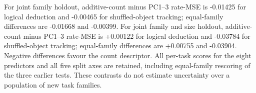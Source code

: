 For joint family holdout, additive-count minus PC1--3 rate-MSE is -0.01425 for logical deduction and -0.00465 for shuffled-object tracking; equal-family differences are -0.01668 and -0.00399. For joint family and size holdout, additive-count minus PC1--3 rate-MSE is +0.00122 for logical deduction and -0.03784 for shuffled-object tracking; equal-family differences are +0.00755 and -0.03904. Negative differences favour the count descriptor. All per-task scores for the eight predictors and all five split axes are retained, including equal-family rescoring of the three earlier tests. These contrasts do not estimate uncertainty over a population of new task families.
